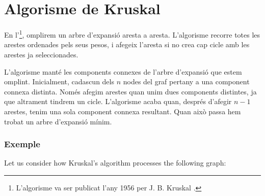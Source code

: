 \section{Algorisme de Kruskal}


En l'\footnote{L'algorisme va ser publicat
l'any 1956 per J. B. Kruskal \cite{kru56}.}, omplirem un arbre
d'expansió aresta a aresta. L'algorisme recorre totes les arestes
ordenades pels seus pesos, i afegeix l'aresta si no crea cap cicle amb
les arestes ja seleccionades.

L'algorisme manté les components connexes de l'arbre d'expansió que
estem omplint. Inicialment, cadascun dels $n$ nodes del graf pertany a
una component connexa distinta. Només afegim arestes quan unim dues
components distintes, ja que altrament tindrem un cicle. L'algorisme
acaba quan, després d'afegir $n-1$ arestes, tenim una sola component
connexa resultant. Quan això passa hem trobat un arbre d'expansió
mínim.

\subsubsection{Exemple}


\begin{samepage}
Let us consider how Kruskal's algorithm processes the
following graph:
\begin{center}
\end{center}
\end{samepage}



